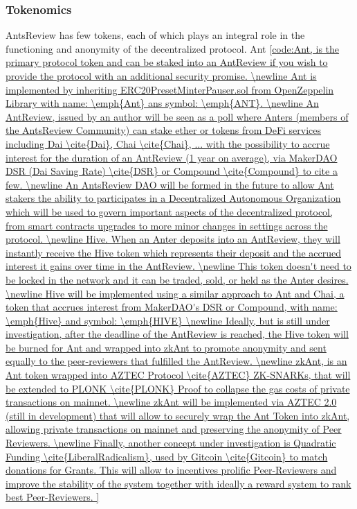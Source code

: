 \documentclass[runningheads]{llncs}
\begin{document}
\subsubsection{Tokenomics}

AntsReview has few tokens, each of which plays an integral role in the functioning and anonymity of the decentralized protocol.
\newline Ant \ref{code:Ant, is the primary protocol token and can be staked into an AntReview if you wish to provide the protocol with an additional security promise.
\newline Ant is implemented by inheriting ERC20PresetMinterPauser.sol from OpenZeppelin Library with name: \emph{Ant} ans symbol: \emph{ANT}.
\newline An AntReview, issued by an author will be seen as a poll where Anters (members of the AntsReview Community) can stake ether or tokens from DeFi services including Dai \cite{Dai}, Chai \cite{Chai}, ... with the possibility to accrue interest for the duration of an AntReview (1 year on average), via MakerDAO DSR (Dai Saving Rate) \cite{DSR} or Compound \cite{Compound} to cite a few.
\newline An AntsReview DAO will be formed in the future to allow Ant stakers the ability to participates in a Decentralized Autonomous Organization which will be used to govern important aspects of the decentralized protocol, from smart contracts upgrades to more minor changes in settings across the protocol.
\newline Hive. When an Anter deposits into an AntReview, they will instantly receive the Hive token which represents their deposit and the accrued interest it gains over time in the AntReview.
\newline This token doesn't need to be locked in the network and it can be traded, sold, or held as the Anter desires.
\newline Hive will be implemented using a similar approach to Ant and Chai, a token that accrues interest from MakerDAO's DSR or Compound, with name: \emph{Hive} and symbol: \emph{HIVE}
\newline Ideally, but is still under investigation, after the deadline of the AntReview is reached, the Hive token will be burned for Ant and wrapped into zkAnt to promote anonymity and sent equally to the peer-reviewers that fulfilled the AntReview.
\newline zkAnt, is an Ant token wrapped into AZTEC Protocol \cite{AZTEC} ZK-SNARKs, that will be extended to PLONK \cite{PLONK} Proof to collapse the gas costs of private transactions on mainnet.
\newline zkAnt will be implemented via AZTEC 2.0 (still in development) that will allow to securely wrap the Ant Token into zkAnt, allowing private transactions on mainnet and preserving the anonymity of Peer Reviewers.
\newline Finally, another concept under investigation is Quadratic Funding \cite{LiberalRadicalism}, used by Gitcoin \cite{Gitcoin} to match donations for Grants. This will allow to incentives prolific Peer-Reviewers and improve the stability of the system together with ideally a reward system to rank best Peer-Reviewers.

}
\end{document}
